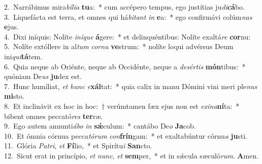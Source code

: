 {2.~}Narrábimus mira\textit{bí}\textit{li}\textit{a} \textbf{tu}a:~* cum accépero tempus, ego justítias ju\textit{di}\textbf{cá}bo.\\
{3.~}Liquefácta est terra, et omnes qui há\textit{bi}\textit{tant} \textit{in} \textbf{e}a:~* ego confirmávi colúm\textit{nas} \textbf{e}jus.\\
{4.~}Dixi iníquis: Nolíte \textit{i}\textit{ní}\textit{que} \textbf{á}gere:~* et delinquéntibus: Nolíte exaltá\textit{re} \textbf{cor}nu:\\
{5.~}Nolíte extóllere in al\textit{tum} \textit{cor}\textit{nu} \textbf{ve}strum:~* nolíte loqui advérsus Deum ini\textit{qui}\textbf{tá}tem.\\
{6.~}Quia neque ab Oriénte, neque ab Occidénte, neque a \textit{de}\textit{sér}\textit{tis} \textbf{món}tibus:~* quóniam De\textit{us} \textbf{ju}dex est.\\
{7.~}Hunc humíliat, \textit{et} \textit{hunc} \textit{e}\textbf{xál}tat:~* quia calix in manu Dómini vini meri ple\textit{nus} \textbf{mi}sto.\\
{8.~}Et inclinávit ex hoc in hoc:~† verúmtamen fæx ejus non est \textit{e}\textit{xi}\textit{na}\textbf{ní}ta:~* bibent omnes peccató\textit{res} \textbf{ter}ræ.\\
{9.~}Ego autem annunti\textit{á}\textit{bo} \textit{in} \textbf{sǽ}culum:~* cantábo De\textit{o} \textbf{Ja}cob.\\
{10.~}Et ómnia córnua pecca\textit{tó}\textit{rum} \textit{con}\textbf{frín}gam:~* et exaltabúntur córnu\textit{a} \textbf{ju}sti.\\
{11.~}Glória \textit{Pa}\textit{tri}, \textit{et} \textbf{Fí}lio,~* et Spirítu\textit{i} \textbf{San}cto.\\
{12.~}Sicut erat in princípio, \textit{et} \textit{nunc}, \textit{et} \textbf{sem}per,~* et in sǽcula sæculó\textit{rum}. \textbf{A}men.\\
